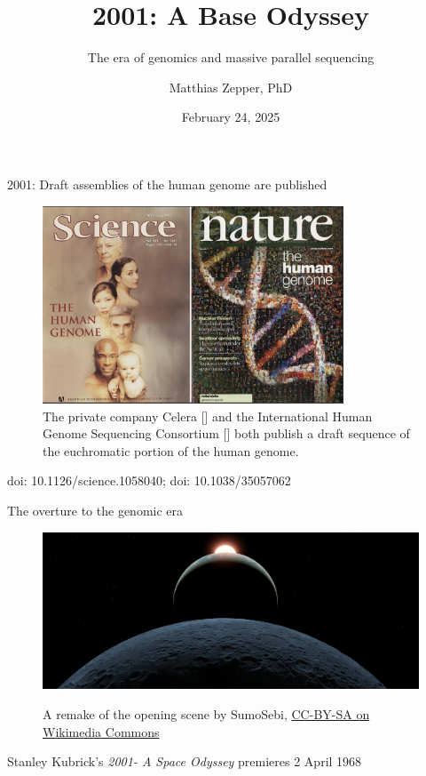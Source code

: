\documentclass[10pt]{beamer}
\title{2001: A Base Odyssey}
\subtitle{The era of genomics and massive parallel sequencing}
\date{February 24, 2025}
\author{Matthias Zepper, PhD}
\institute{NGI Stockholm\par \href{https://ngisweden.scilifelab.se}{https://ngisweden.scilifelab.se}}
\newcommand{\credit}[1]{{\vspace{\fill} \par \raggedleft \scriptsize \mdseries \color{mDarkBrown} #1 \par}}
\newcommand{\creditdarknofill}[1]{{\par \raggedleft \scriptsize \mdseries \color{scMGray} #1 \par}}
\newcommand{\citeme}[1]{{\xspace\color{scAqua} \scriptsize [\cite{#1}]}}
\begin{document}
\maketitle

\begin{frame}{2001: Draft assemblies of the human genome are published}
	\begin{figure}
		\includegraphics[width=0.8\textwidth]{figures/humangenomeproject.png}
		\caption{The private company Celera\citeme{Venter2001} and the International Human Genome Sequencing Consortium\citeme{Lander2001} both publish a draft sequence of the euchromatic portion of the human genome.}
	\end{figure}
	\credit{doi: 10.1126/science.1058040; doi: 10.1038/35057062}
\end{frame}

\begin{frame}[standout]{The overture to the genomic era}
	\begin{figure}
		\hspace*{-1.1cm}
		\includegraphics[width=1.25\textwidth]{./additional_graphics/Opening_2001-_A_Space_Odyssey.png}
		\creditdarknofill{A remake of the opening scene by SumoSebi, \href{https://commons.wikimedia.org/wiki/File:Opening_2001-_A_Space_Odyssey.png}{CC-BY-SA on Wikimedia Commons}}
	\end{figure}
	{\small	Stanley Kubrick's \emph{2001- A Space Odyssey} premieres  2 April 1968}

\end{frame}
\end{document}
